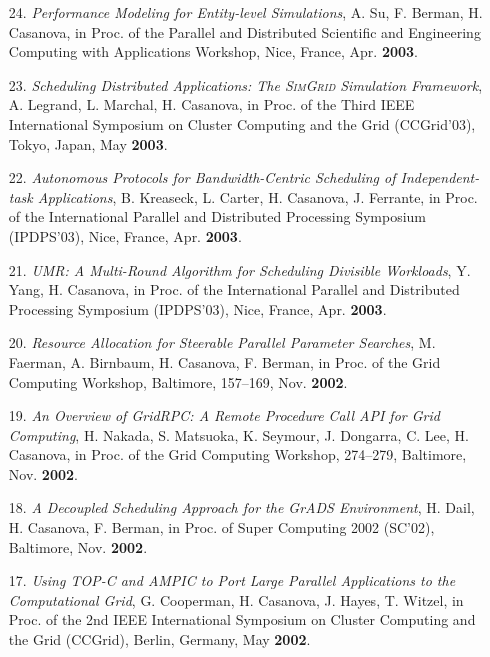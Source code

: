 \begin{enumerate}
\item [24.]
{\it Performance Modeling for Entity-level Simulations}, A. Su, F. Berman,
H. Casanova, in Proc. of the Parallel and Distributed Scientific
and Engineering Computing with Applications Workshop, Nice, France,
Apr. {\bf 2003}.

\item [23.]
{\it Scheduling Distributed Applications: The \textsc{SimGrid} Simulation
Framework}, A. Legrand, L. Marchal, H. Casanova, in Proc. of the
Third IEEE International Symposium on Cluster Computing and the Grid
(CCGrid'03), Tokyo, Japan, May {\bf 2003}.


\item[22.]
{\it Autonomous Protocols for Bandwidth-Centric Scheduling of
Independent-task Applications}, B. Kreaseck, L. Carter, H. Casanova,
J. Ferrante, in Proc. of the International Parallel and Distributed
Processing Symposium (IPDPS'03), Nice, France, Apr. {\bf 2003}.

\item [21.]
\emph{UMR: A Multi-Round Algorithm for Scheduling Divisible Workloads},
Y. Yang, H. Casanova, in Proc. of the International Parallel
and Distributed Processing Symposium (IPDPS'03), Nice, France, Apr.
{\bf 2003}.

\item [20.]
{\it Resource Allocation for Steerable Parallel Parameter Searches},
M. Faerman, A. Birnbaum, H. Casanova, F. Berman, in Proc. of the
Grid Computing Workshop, Baltimore, 157--169, Nov. {\bf 2002}.

\item [19.]
{\it An Overview of GridRPC: A Remote Procedure Call API for Grid
Computing}, H. Nakada, S. Matsuoka, K. Seymour, J. Dongarra, C. Lee,
H. Casanova, in Proc. of the Grid Computing Workshop, 274--279,
Baltimore, Nov. {\bf 2002}.

\item [18.]
{\it A Decoupled Scheduling Approach for the GrADS Environment}, H. Dail,
H. Casanova, F. Berman, in Proc. of  Super Computing 2002 (SC'02),
Baltimore, Nov. {\bf 2002}.

\item[17.]
{\it Using TOP-C and AMPIC to Port Large Parallel Applications to the
Computational Grid}, G. Cooperman, H. Casanova, J. Hayes, T. Witzel, in
Proc. of the 2nd IEEE International Symposium on Cluster Computing
and the Grid (CCGrid), Berlin, Germany, May {\bf 2002}.


\end{enumerate}
